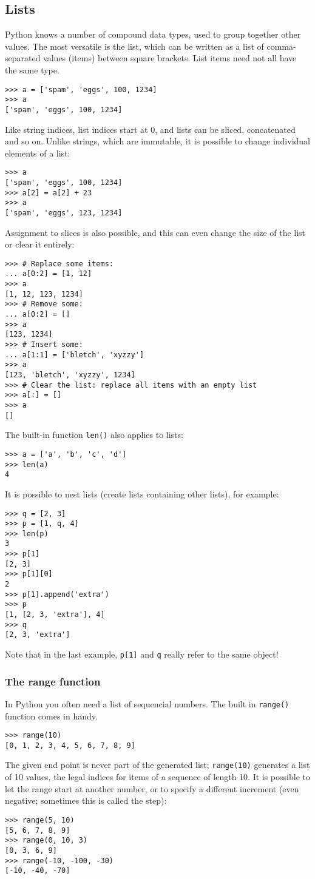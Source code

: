 \documentclass[10pt,a4paper]{article}
\begin{document}
\subsection{Lists}
Python knows a number of compound data types, used to group together other values. The most versatile is the list, which can be written as a list of comma-separated values (items) between square brackets. List items need not all have the same type.
\begin{lstlisting}
>>> a = ['spam', 'eggs', 100, 1234]
>>> a
['spam', 'eggs', 100, 1234]
\end{lstlisting}
Like string indices, list indices start at 0, and lists can be sliced, concatenated and so on.
Unlike strings, which are immutable, it is possible to change individual elements of a list:
\begin{lstlisting}
>>> a
['spam', 'eggs', 100, 1234]
>>> a[2] = a[2] + 23
>>> a
['spam', 'eggs', 123, 1234]
\end{lstlisting}
Assignment to slices is also possible, and this can even change the size of the list or clear it entirely:
\begin{lstlisting}
>>> # Replace some items:
... a[0:2] = [1, 12]
>>> a
[1, 12, 123, 1234]
>>> # Remove some:
... a[0:2] = []
>>> a
[123, 1234]
>>> # Insert some:
... a[1:1] = ['bletch', 'xyzzy']
>>> a
[123, 'bletch', 'xyzzy', 1234]
>>> # Clear the list: replace all items with an empty list
>>> a[:] = []
>>> a
[]
\end{lstlisting}
The built-in function \verb|len()| also applies to lists:
\begin{lstlisting}
>>> a = ['a', 'b', 'c', 'd']
>>> len(a)
4
\end{lstlisting}
It is possible to nest lists (create lists containing other lists), for example:
\begin{lstlisting}
>>> q = [2, 3]
>>> p = [1, q, 4]
>>> len(p)
3
>>> p[1]
[2, 3]
>>> p[1][0]
2
>>> p[1].append('extra')
>>> p
[1, [2, 3, 'extra'], 4]
>>> q
[2, 3, 'extra']
\end{lstlisting}
Note that in the last example, \verb|p[1]| and \verb|q| really refer to the same object!
\subsubsection{The range function}
In Python you often need a list of sequencial numbers.
The built in \verb|range()| function comes in handy.
\begin{lstlisting}
>>> range(10)
[0, 1, 2, 3, 4, 5, 6, 7, 8, 9]
\end{lstlisting}
The given end point is never part of the generated list; \verb|range(10)| generates a list of 10 values, the legal indices for items of a sequence of length 10. It is possible to let the range start at another number, or to specify a different increment (even negative; sometimes this is called the step):
\begin{lstlisting}
>>> range(5, 10)
[5, 6, 7, 8, 9]
>>> range(0, 10, 3)
[0, 3, 6, 9]
>>> range(-10, -100, -30)
[-10, -40, -70]
\end{lstlisting}
\end{document}
